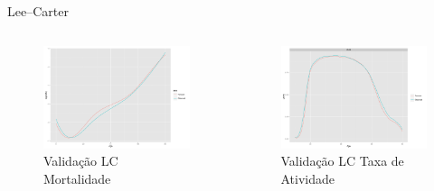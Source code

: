 \documentclass{beamer}
\begin{document}
\begin{frame}{Lee--Carter}
	\begin{columns}[c]
	\column{6cm}
	\begin{figure}
		\caption{Validação LC Mortalidade}
		\includegraphics[width=\textwidth]{Graphs/DR_validation.pdf}
	\end{figure}
	\column{6cm}
	\begin{figure}
		\caption{Validação LC Taxa de Atividade}
		\includegraphics[width=\textwidth]{Graphs/LFPR_validation.pdf}
	\end{figure}
	\end{columns}  
\end{frame}
\end{document}
